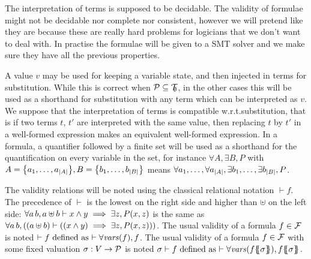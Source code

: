 \documentclass{article}
\begin{document}
The interpretation of terms is supposed to be decidable.
The validity of formulae might not be decidable nor complete nor consistent, however we will pretend like they are because these are really hard problems for logicians that we don't want to deal with.
In practise the formulae will be given to a SMT solver and we make sure they have all the previous properties.

A value \(v\) may be used for keeping a variable state, and then injected in terms for substitution.
While this is correct when \(\mathcal{P} \subseteq {\mathcal{T}}_{\!\!\emptyset}\), in the other cases this will be used as a shorthand for substitution with any term which can be interpreted as \(v\).
We suppose that the interpretation of terms is compatible w.r.t.\@ substitution, that is if two terms \(t\), \(t'\) are interpreted with the same value, then replacing \(t\) by \(t'\) in a well-formed expression makes an equivalent well-formed expression.
In a formula, a quantifier followed by a finite set will be used as a shorthand for the quantification on every variable in the set, for instance \(\forall A, \exists B, P\) with \(A = {\left\{a_1, \dots, a_{\left|A\right|}\right\}}, B = {\left\{b_1, \dots, b_{\left|B\right|}\right\}}\) means \(\forall a_1, \dots, \forall a_{\left|A\right|}, \exists b_1, \dots, \exists b_{\left|B\right|}, P\).

The validity relations will be noted using the classical relational notation \(\vdash f\).
The precedence of \(\vdash\) is the lowest on the right side and higher than \(\uplus\) on the left side: \(\forall a \, b, a \uplus b \vdash x \wedge y \implies \exists z, P{\left(x,z\right)}\) is the same as \(\forall a \, b, {\left({\left(a \uplus b\right)} \vdash {\left({\left(x \wedge y\right)} \implies \exists z, P{\left(x,z\right)}\right)}\right)}\).
The usual validity of a formula \(f \in {\mathcal{F}}\) is noted \({\vdash f} \text{ defined as } {\vdash \forall \mathit{vars}{\left(f\right)}, f}\).
The usual validity of a formula \(f \in {\mathcal{F}}\) with some fixed valuation \(\sigma: V \to \mathcal{P}\) is noted \({\sigma \vdash f} \defnotation {\vdash \forall \fvars{f\psubst{\sigma}}, f\psubst{\sigma}}\). %
\end{document}
